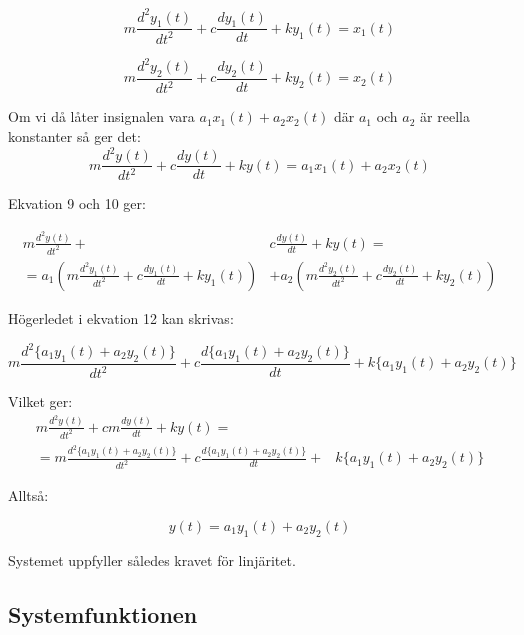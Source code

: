 \documentclass[10pt,a4paper]{article}
\begin{document}
\begin{equation}
m\frac{d^2y_1(t)}{dt^2} + c\frac{dy_1(t)}{dt} + ky_1(t) = x_1(t)
\end{equation}

\begin{equation}
m\frac{d^2y_2(t)}{dt^2} + c\frac{dy_2(t)}{dt} + ky_2(t) = x_2(t)
\end{equation}


Om vi då låter insignalen vara $a_1 x_1(t) + a_2 x_2(t)$ där $a_1$ och $a_2$ är reella konstanter så ger det:
\begin{equation}
m\frac{d^2y(t)}{dt^2} + c\frac{dy(t)}{dt} + ky(t) = a_1 x_1(t) + a_2 x_2(t)
\end{equation}

Ekvation 9 och 10 ger:

\begin{equation}
\begin{split}
m\frac{d^2y(t)}{dt^2} + & c\frac{dy(t)}{dt} + ky(t) = \\ = a_1(m\frac{d^2y_1(t)}{dt^2} + c\frac{dy_1(t)}{dt} +  ky_1(t)) & + a_2(m\frac{d^2y_2(t)}{dt^2} + c\frac{dy_2(t)}{dt} + ky_2(t))
\end{split}
\end{equation}

Högerledet i ekvation 12 kan skrivas:

\begin{equation}
m\frac{d^2\{a_1y_1(t) + a_2y_2(t)\}}{dt^2} + c\frac{d\{a_1y_1(t) + a_2y_2(t)\}}{dt} + k\{a_1y_1(t) + a_2y_2(t)\}
\end{equation}

Vilket ger:
\begin{equation}
\begin{split}
m\frac{d^2y(t)}{dt^2} +  cm\frac{dy(t)}{dt} + ky(t) = & \\ = m\frac{d^2\{a_1y_1(t) + a_2y_2(t)\}}{dt^2} + c\frac{d\{a_1y_1(t) + a_2y_2(t)\}}{dt} + & k\{a_1y_1(t) + a_2y_2(t)\}
\end{split}
\end{equation}

Alltså:

\begin{equation}
y(t) = a_1 y_1(t) + a_2 y_2(t)
\end{equation}

Systemet uppfyller således kravet för linjäritet.

\newpage



\subsection{Systemfunktionen}
\end{document}
